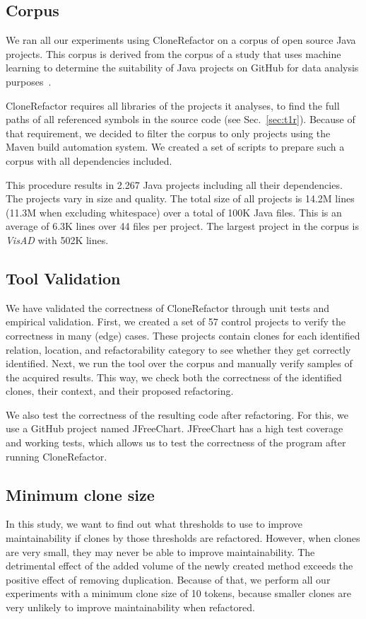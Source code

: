 \documentclass[]{IEEEtran}
\begin{document}
\subsection{Corpus}
We ran all our experiments using CloneRefactor on a corpus of open source Java projects. This corpus is derived from the corpus of a study that uses machine learning to determine the suitability of Java projects on GitHub for data analysis purposes~\cite{githubCorpus2013}.

CloneRefactor requires all libraries of the projects it analyses, to find the full paths of all referenced symbols in the source code (see Sec.~\ref{sec:t1r}). Because of that requirement, we decided to filter the corpus to only projects using the Maven build automation system. We created a set of scripts to prepare such a corpus with all dependencies included.

This procedure results in 2.267 Java projects including all their dependencies. The projects vary in size and quality. The total size of all projects is 14.2M lines (11.3M when excluding whitespace) over a total of 100K Java files. This is an average of 6.3K lines over 44 files per project. The largest project in the corpus is \textit{VisAD} with 502K lines.

\subsection{Tool Validation}
We have validated the correctness of CloneRefactor through unit tests and empirical validation. First, we created a set of 57 control projects to verify the correctness in many (edge) cases. These projects contain clones for each identified relation, location, and refactorability category to see whether they get correctly identified. Next, we run the tool over the corpus and manually verify samples of the acquired results. This way, we check both the correctness of the identified clones, their context, and their proposed refactoring.

We also test the correctness of the resulting code after refactoring. For this, we use a GitHub project named JFreeChart. JFreeChart has a high test coverage and working tests, which allows us to test the correctness of the program after running CloneRefactor.

\subsection{Minimum clone size}
In this study, we want to find out what thresholds to use to improve maintainability if clones by those thresholds are refactored. However, when clones are very small, they may never be able to improve maintainability. The detrimental effect of the added volume of the newly created method exceeds the positive effect of removing duplication. Because of that, we perform all our experiments with a minimum clone size of 10 tokens, because smaller clones are very unlikely to improve maintainability when refactored.
\end{document}
